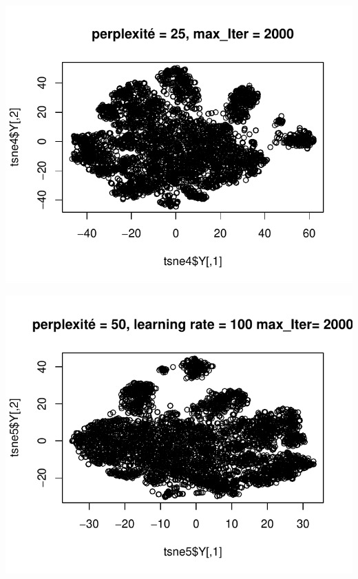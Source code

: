 \documentclass[]{imsart}
\numberwithin{equation}{section}
\theoremstyle{plain}
\begin{document}
\begin{flushleft}\includegraphics{Analyse_Exploratoire_Projet_files/figure-latex/unnamed-chunk-20-4} \end{flushleft}

\begin{flushleft}\includegraphics{Analyse_Exploratoire_Projet_files/figure-latex/unnamed-chunk-20-5} \end{flushleft}
\end{document}
